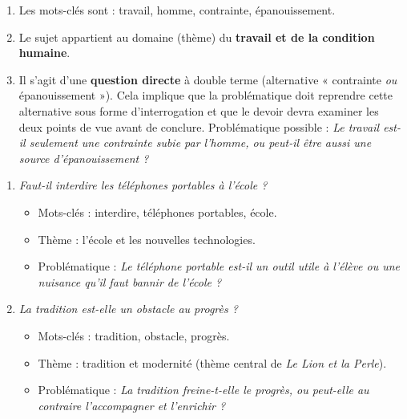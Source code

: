 \documentclass[11pt]{article}
\newcommand{\cle}[1]{{\popxbold\color{popdark}#1}}
\begin{document}
\begin{corrige}
\begin{enumerate}
\item Les mots-clés sont : \cle{travail}, \cle{homme}, \cle{contrainte}, \cle{épanouissement}.
\item Le sujet appartient au domaine (thème) du \textbf{travail et de la condition humaine}.
\item Il s'agit d'une \textbf{question directe} à double terme (alternative « contrainte \emph{ou} épanouissement »). Cela implique que la problématique doit reprendre cette alternative sous forme d'interrogation et que le devoir devra examiner les deux points de vue avant de conclure. Problématique possible : \emph{Le travail est-il seulement une contrainte subie par l'homme, ou peut-il être aussi une source d'épanouissement ?}
\end{enumerate}
\end{corrige}

\begin{corrige}
\begin{enumerate}
\item \emph{Faut-il interdire les téléphones portables à l'école ?}
\begin{itemize}
\item Mots-clés : \cle{interdire}, \cle{téléphones portables}, \cle{école}.
\item Thème : l'école et les nouvelles technologies.
\item Problématique : \emph{Le téléphone portable est-il un outil utile à l'élève ou une nuisance qu'il faut bannir de l'école ?}
\end{itemize}
\item \emph{La tradition est-elle un obstacle au progrès ?}
\begin{itemize}
\item Mots-clés : \cle{tradition}, \cle{obstacle}, \cle{progrès}.
\item Thème : tradition et modernité (thème central de \emph{Le Lion et la Perle}).
\item Problématique : \emph{La tradition freine-t-elle le progrès, ou peut-elle au contraire l'accompagner et l'enrichir ?}
\end{itemize}
\end{enumerate}
\end{corrige}
\end{document}
